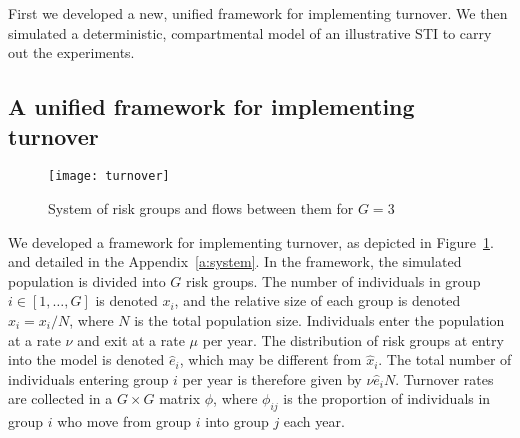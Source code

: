 First we developed a new, unified framework for implementing turnover. 
We then simulated a deterministic, compartmental model of
an illustrative STI to carry out the experiments.

\subsection{A unified framework for implementing turnover} %
\label{ss:system}
\begin{figure}
  \centering
  \texttt{[image: turnover]}
  \caption{System of risk groups and flows between them for $G = 3$}
  \label{fig:system}
\end{figure}
We developed a framework for implementing turnover,	
as depicted in  Figure~\ref{fig:system}.
and detailed in the Appendix~\ref{a:system}. 
In the framework, the simulated population is divided into $G$ risk groups.
The number of individuals in group $i \in [1, \dots, G]$ is denoted $x_i$,
and the relative size of each group is denoted $\hat{x}_i = x_i / N$,
where $N$ is the total population size.
Individuals enter the population at a rate $\nu$ and exit at a rate $\mu$ per year.
The distribution of risk groups at entry into the model
is denoted $\hat{e}_i$, which may be different from $\hat{x}_i$.
The total number of individuals entering group $i$ per year
is therefore given by $\nu \hat{e}_i N$.
Turnover rates are collected in a $G \times G$ matrix $\phi$,
where $\phi_{ij}$ is the proportion of individuals in group $i$
who move from group $i$ into group $j$ each year.

